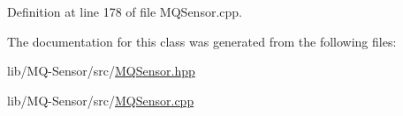 Definition at line 178 of file M\+Q\+Sensor.\+cpp.



The documentation for this class was generated from the following files\+:\begin{DoxyCompactItemize}
\item 
lib/\+M\+Q-\/\+Sensor/src/\hyperlink{_m_q_sensor_8hpp}{M\+Q\+Sensor.\+hpp}\item 
lib/\+M\+Q-\/\+Sensor/src/\hyperlink{_m_q_sensor_8cpp}{M\+Q\+Sensor.\+cpp}\end{DoxyCompactItemize}
